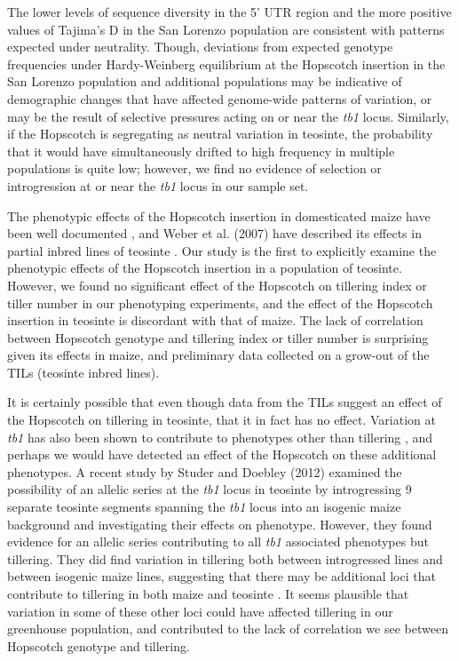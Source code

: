 \documentclass[12pt]{article}
\begin{document}
The lower levels of sequence diversity in the 5' UTR region and the more positive values of Tajima's D in the San Lorenzo population are consistent with patterns expected under neutrality. Though, deviations from expected genotype frequencies under Hardy-Weinberg equilibrium at the Hopscotch insertion in the San Lorenzo population and additional populations may be indicative of demographic changes that have affected genome-wide patterns of variation, or may be the result of selective pressures acting on or near the \emph{tb1} locus. Similarly, if the Hopscotch is segregating as neutral variation in teosinte, the probability that it would have simultaneously drifted to high frequency in multiple populations is quite low; however, we find no evidence of selection or introgression at or near the \emph{tb1} locus in our sample set.

The phenotypic effects of the Hopscotch insertion in domesticated maize have been well documented \cite{Clark et al 2006, Studer et al 2011}, and Weber et al. (2007) have described its effects in partial inbred lines of teosinte \cite{Weber et al 2007}. Our study is the first to explicitly examine the phenotypic effects of the Hopscotch insertion in a population of teosinte. However, we found no significant effect of the Hopscotch on tillering index or tiller number in our phenotyping experiments, and the effect of the Hopscotch insertion in teosinte is discordant with that of maize. The lack of correlation between Hopscotch genotype and tillering index or tiller number is surprising given its effects in maize, and preliminary data collected on a grow-out of the TILs (teosinte inbred lines). 

It is certainly possible that even though data from the TILs suggest an effect of the Hopscotch on tillering in teosinte, that it in fact has no effect. Variation at \emph{tb1} has also been shown to contribute to phenotypes other than tillering \cite{Clark et al 2006}, and perhaps we would have detected an effect of the Hopscotch on these additional phenotypes. A recent study by Studer and Doebley (2012) examined the possibility of an allelic series at the \emph{tb1} locus in teosinte by introgressing 9 separate teosinte segments spanning the \emph{tb1} locus into an isogenic maize background and investigating their effects on phenotype. However, they found evidence for an allelic series contributing to all \emph{tb1} associated phenotypes but tillering. They did find variation in tillering both between introgressed lines and between isogenic maize lines, suggesting that there may be additional loci that contribute to tillering in both maize and teosinte \cite{Studer and Doebley 2012}. It seems plausible that variation in some of these other loci could have affected tillering in our greenhouse population, and contributed to the lack of correlation we see between Hopscotch genotype and tillering. 
\end{document}
